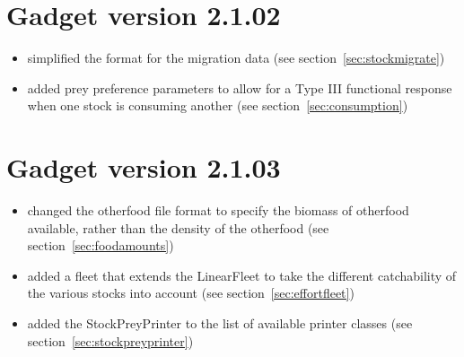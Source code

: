 \documentclass[10pt,twoside]{book}
\begin{document}
\section{Gadget version 2.1.02}\label{sec:v2102}
\begin{itemize}
\item simplified the format for the migration data (see section~\ref{sec:stockmigrate})
\item added prey preference parameters to allow for a Type III functional response when one stock is consuming another (see section~\ref{sec:consumption})
\end{itemize}

\section{Gadget version 2.1.03}\label{sec:v2103}
\begin{itemize}
\item changed the otherfood file format to specify the biomass of otherfood available, rather than the density of the otherfood (see section~\ref{sec:foodamounts})
\item added a fleet that extends the LinearFleet to take the different catchability of the various stocks into account (see section~\ref{sec:effortfleet})
\item added the StockPreyPrinter to the list of available printer classes (see section~\ref{sec:stockpreyprinter})
\end{itemize}
\end{document}
